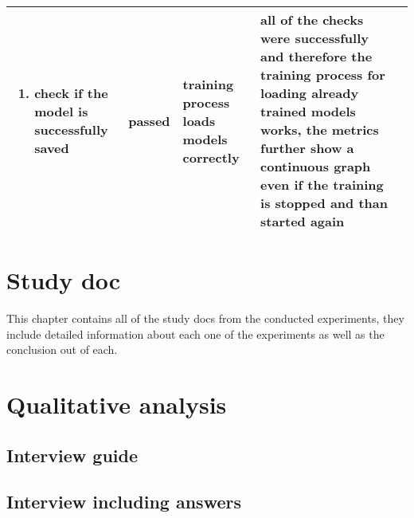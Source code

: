 \begin{longtable}{p{} | p{} | p{} | p{} | p{}}
\begin{minipage}{3.8in}
\begin{enumerate}
        \item check if the model is successfully saved
        \end{enumerate}
        \vskip 4pt
        \end{minipage} & \cellcolor{green!30!white}passed & training process loads models correctly & all of the checks were successfully and therefore the training process for loading already trained models works, the metrics further show a continuous graph even if the training is stopped and than started again \\
    \bottomrule
\end{longtable}

\clearpage
{}

\chapter{Study doc}
\label{app:Study-Doc}
This chapter contains all of the study docs from the conducted experiments, they include detailed information about each one of the experiments as well as the conclusion out of each.











\chapter{Qualitative analysis}
\label{app:Qualitative-analysis}

\section{Interview guide}
\label{sec:Interview-Guide}



\section{Interview including answers}
\label{sec:Interview-Answers}

